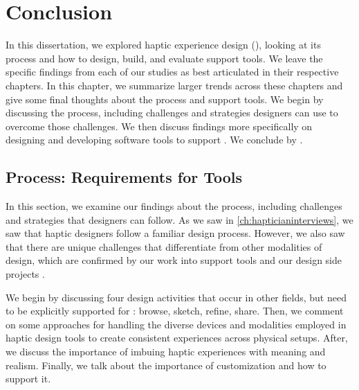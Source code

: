 \chapter{Conclusion}
\label{ch:conclusion}
In this dissertation, we explored haptic experience design (\haxd), looking at its process and how to design, build, and evaluate \haxd support tools.
We leave the specific findings from each of our studies as best articulated in their respective chapters.
In this chapter, we summarize larger trends across these chapters and give some final thoughts about the \haxd process and support tools.
We begin by discussing the \haxd process, including challenges and strategies designers can use to overcome those challenges.
We then discuss findings more specifically on designing and developing software tools to support \haxd.
We conclude by .


%
%


%
%
\section{\haxd Process: Requirements for Tools}
In this section, we examine our findings about the \haxd process, including challenges and strategies that designers can follow.
As we saw in \autoref{ch:hapticianinterviews}, we saw that haptic designers follow a familiar design process.
However, we also saw that there are unique challenges that differentiate \haxd from other modalities of design, which are confirmed by our work into \haxd support tools and our design side projects .

We begin by discussing four design activities that occur in other fields, but need to be explicitly supported for \haxd: browse, sketch, refine, share.
Then, we comment on some approaches for handling the diverse devices and modalities employed in haptic design tools to create consistent experiences across physical setups.
After, we discuss the importance of imbuing haptic experiences with meaning and realism.
Finally, we talk about the importance of customization and how to support it.

